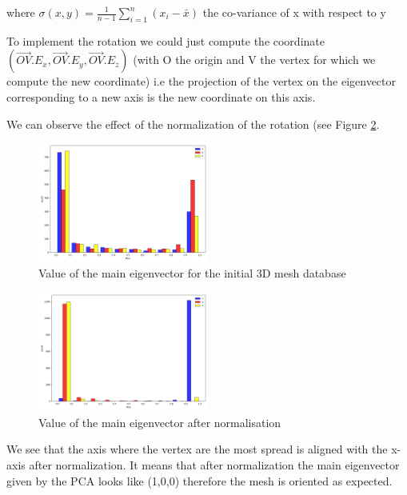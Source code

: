 \documentclass[10pt,twocolumn,letterpaper]{article}
\begin{document}
where $ \sigma(x,y) = \frac{1}{n-1} \sum\limits_{i=1}^n ( x_i - \bar{x} ) $ the co-variance of x with respect to y
	
	To  implement the rotation we could just compute the coordinate $(\overrightarrow{OV}.E_x, \overrightarrow{OV}.E_y, \overrightarrow{OV}.E_z)$ (with O the origin and V the vertex for which we compute the new coordinate) i.e the projection of the vertex on the eigenvector corresponding to a new axis is the new coordinate on this axis.
	
	We can observe the effect of the normalization of the rotation (see Figure \ref{fig:PCA-after}.

\begin{figure}[h!]
\begin{center}
  \includegraphics[width=0.5\textwidth]{picture/Initial pca}
  \caption{Value of the main eigenvector for the initial 3D mesh database}
  \label{fig:PCA-before}
  \end{center}
\end{figure}

\begin{figure}[h!]
\begin{center}
  \includegraphics[width=0.5\textwidth]{picture/Normalised pca}
  \caption{Value of the main eigenvector after normalisation}
  \label{fig:PCA-after}
  \end{center}
\end{figure}
	
	We see that the axis where the vertex are the most spread is aligned with the x-axis after normalization. It means that after normalization the main eigenvector given by the PCA looks like (1,0,0) therefore the mesh is oriented as expected.
	
\end{document}
